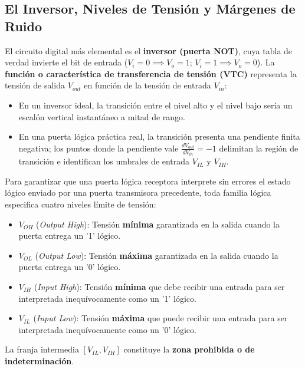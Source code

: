 \subsection{El Inversor, Niveles de Tensión y Márgenes de Ruido}
El circuito digital más elemental es el \textbf{inversor (puerta NOT)}, cuya tabla de verdad invierte el bit de entrada ($V_i = 0 \implies V_o = 1$; $V_i = 1 \implies V_o = 0$). La \textbf{función o característica de transferencia de tensión (VTC)} representa la tensión de salida $V_{out}$ en función de la tensión de entrada $V_{in}$:
\begin{itemize}[leftmargin=*]
    \item En un inversor ideal, la transición entre el nivel alto y el nivel bajo sería un escalón vertical instantáneo a mitad de rango.
    \item En una puerta lógica práctica real, la transición presenta una pendiente finita negativa; los puntos donde la pendiente vale $\frac{dV_{out}}{dV_{in}} = -1$ delimitan la región de transición e identifican los umbrales de entrada $V_{IL}$ y $V_{IH}$.
\end{itemize}

\begin{definicion}
Para garantizar que una puerta lógica receptora interprete sin errores el estado lógico enviado por una puerta transmisora precedente, toda familia lógica especifica cuatro niveles límite de tensión:
\begin{itemize}[leftmargin=*]
    \item $V_{OH}$ (\textit{Output High}): Tensión \textbf{mínima} garantizada en la salida cuando la puerta entrega un '1' lógico.
    \item $V_{OL}$ (\textit{Output Low}): Tensión \textbf{máxima} garantizada en la salida cuando la puerta entrega un '0' lógico.
    \item $V_{IH}$ (\textit{Input High}): Tensión \textbf{mínima} que debe recibir una entrada para ser interpretada inequívocamente como un '1' lógico.
    \item $V_{IL}$ (\textit{Input Low}): Tensión \textbf{máxima} que puede recibir una entrada para ser interpretada inequívocamente como un '0' lógico.
\end{itemize}
La franja intermedia $[V_{IL}, V_{IH}]$ constituye la \textbf{zona prohibida o de indeterminación}.
\end{definicion}

